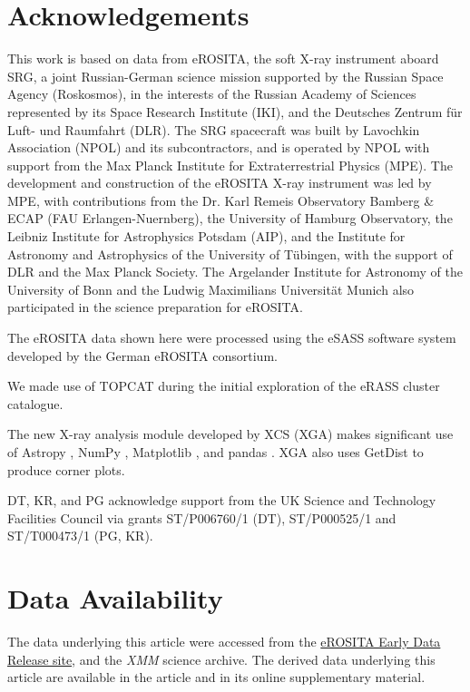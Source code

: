 \documentclass[fleqn,usenatbib]{mnras}
\begin{document}
\section*{Acknowledgements}
This work is based on data from eROSITA, the soft X-ray instrument aboard SRG, a joint Russian-German science mission supported by the Russian Space Agency (Roskosmos), in the interests of the Russian Academy of Sciences represented by its Space Research Institute (IKI), and the Deutsches Zentrum für Luft- und Raumfahrt (DLR). The SRG spacecraft was built by Lavochkin Association (NPOL) and its subcontractors, and is operated by NPOL with support from the Max Planck Institute for Extraterrestrial Physics (MPE). The development and construction of the eROSITA X-ray instrument was led by MPE, with contributions from the Dr. Karl Remeis Observatory Bamberg \& ECAP (FAU Erlangen-Nuernberg), the University of Hamburg Observatory, the Leibniz Institute for Astrophysics Potsdam (AIP), and the Institute for Astronomy and Astrophysics of the University of Tübingen, with the support of DLR and the Max Planck Society. The Argelander Institute for Astronomy of the University of Bonn and the Ludwig Maximilians Universität Munich also participated in the science preparation for eROSITA.

The eROSITA data shown here were processed using the eSASS software system developed by the German eROSITA consortium.

We made use of TOPCAT \citep[][]{topcat} during the initial exploration of the eRASS cluster catalogue.

The new X-ray analysis module developed by XCS (XGA) makes significant use of Astropy \citep[][]{astropy1, astropy2}, NumPy \citep[][]{numpy}, Matplotlib \citep[][]{matplotlib}, and pandas \citep[][]{pandassoftware,pandaspaper}. XGA also uses GetDist \citep[][]{getdist} to produce corner plots.

DT, KR, and PG acknowledge support from the UK Science and Technology Facilities Council via grants ST/P006760/1 (DT),  ST/P000525/1 and ST/T000473/1 (PG, KR).
\section*{Data Availability}

The data underlying this article were accessed from the \href{https://erosita.mpe.mpg.de/edr/eROSITAObservations/Catalogues/}{eROSITA Early Data Release site}, and the {\em XMM} science archive. The derived data underlying this article are available in the article and in its online supplementary material.
\end{document}
